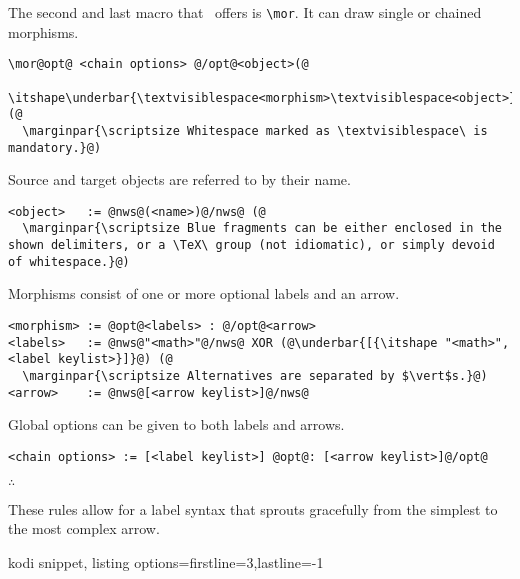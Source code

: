 The second and last macro that \koDi\ offers is \lstinline|\mor|.
It can draw single or chained morphisms.

\begin{lstlisting}
\mor@opt@ <chain options> @/opt@<object>(@
  \itshape\underbar{\textvisiblespace<morphism>\textvisiblespace<object>}@);(@
  \marginpar{\scriptsize Whitespace marked as \textvisiblespace\ is mandatory.}@)
\end{lstlisting}

Source and target objects are referred to by their name.
  
\begin{lstlisting}
<object>   := @nws@(<name>)@/nws@ (@
  \marginpar{\scriptsize Blue fragments can be either enclosed in the shown delimiters, or a \TeX\ group (not idiomatic), or simply devoid of whitespace.}@)
\end{lstlisting}

Morphisms consist of one or more optional labels and an arrow.
  
\begin{lstlisting}
<morphism> := @opt@<labels> : @/opt@<arrow>
<labels>   := @nws@"<math>"@/nws@ XOR (@\underbar{[{\itshape "<math>", <label keylist>}]}@) (@
  \marginpar{\scriptsize Alternatives are separated by $\vert$s.}@)
<arrow>    := @nws@[<arrow keylist>]@/nws@
\end{lstlisting}

Global options can be given to both labels and arrows.

\begin{lstlisting}
<chain options> := [<label keylist>] @opt@: [<arrow keylist>]@/opt@
\end{lstlisting}

\hfill$\therefore$\hfill\null

These rules allow for a label syntax that sprouts gracefully
from the simplest to the most complex arrow.

\begin{tcblisting}{kodi snippet, listing options={firstline=3,lastline=-1}}
\end{tcblisting}

